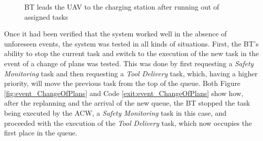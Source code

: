 \begin{figure}[htbp]
    \centering
    \hfill
    \hfill
    \caption{\gls{BT} leads the \gls{UAV} to the charging station after running out of assigned tasks}
    \label{fig:chargeBecouseIdle}
\end{figure}

Once it had been verified that the system worked well in the absence of unforeseen events, the system was tested in all kinds of situations. First, the \gls{BT}'s ability to stop the current task and switch to the execution of the new task in the event of a change of plans was tested. This was done by first requesting a \emph{Safety Monitoring} task and then requesting a \emph{Tool Delivery} task, which, having a higher priority, will move the previous task from the top of the queue. Both Figure \ref{fig:event_ChangeOfPlans} and Code \ref{exit:event_ChangeOfPlans} show how, after the replanning and the arrival of the new queue, the \gls{BT} stopped the task being executed by the \gls{ACW}, a \emph{Safety Monitoring} task in this case, and proceeded with the execution of the \emph{Tool Delivery} task, which now occupies the first place in the queue.

